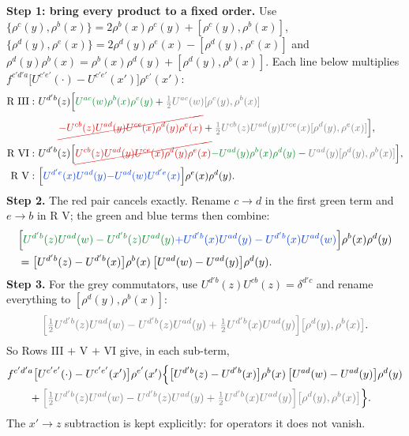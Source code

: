 \documentclass[9pt]{article}
\newcommand{\R}[1]{{\color{cR}#1}}
\newcommand{\B}[1]{{\color{cB}#1}}
\newcommand{\G}[1]{{\color{cG}#1}}
\newcommand{\Gr}[1]{{\color{cX}#1}}
\numberwithin{equation}{section}
\begin{document}
\noindent\textbf{Step 1: bring every product to a fixed order.} Use $\{\rho^{c}(y),\rho^{b}(x)\}=2\rho^{b}(x)\rho^{c}(y)+[\rho^{c}(y),\rho^{b}(x)]$, $\{\rho^{d}(y),\rho^{e}(x)\}=2\rho^{d}(y)\rho^{e}(x)-[\rho^{d}(y),\rho^{e}(x)]$ and $\rho^{d}(y)\rho^{b}(x)=\rho^{b}(x)\rho^{d}(y)+[\rho^{d}(y),\rho^{b}(x)]$. Each line below multiplies $f^{c'd'a}\big[U^{c'e'}(\cdot)-U^{c'e'}(x')\big]\rho^{e'}(x')$:
\begin{align}
\text{R III}:\ &U^{d'b}(z)\Big[\G{U^{ac}(w)\rho^{b}(x)\rho^{c}(y)}+\Gr{\tfrac12U^{ac}(w)[\rho^{c}(y),\rho^{b}(x)]}\notag\\
&\qquad\R{\cancel{-U^{cb}(z)U^{ad}(y)U^{ce}(x)\rho^{d}(y)\rho^{e}(x)}}+\Gr{\tfrac12U^{cb}(z)U^{ad}(y)U^{ce}(x)[\rho^{d}(y),\rho^{e}(x)]}\Big],\notag\\
\text{R VI}:\ &U^{d'b}(z)\Big[\R{\cancel{U^{cb}(z)U^{ad}(y)U^{ce}(x)\rho^{d}(y)\rho^{e}(x)}}\G{-U^{ad}(y)\rho^{b}(x)\rho^{d}(y)}-\Gr{U^{ad}(y)[\rho^{d}(y),\rho^{b}(x)]}\Big],\notag\\
\text{R V}:\ &\Big[\B{U^{d'e}(x)U^{ad}(y)}\B{-U^{ad}(w)U^{d'e}(x)}\Big]\rho^{e}(x)\rho^{d}(y).
\end{align}
\textbf{Step 2.} The \R{red} pair cancels exactly. Rename $c\to d$ in the first green term and $e\to b$ in R V; the \G{green} and \B{blue} terms then combine:
\begin{align}
&\Big[\G{U^{d'b}(z)U^{ad}(w)-U^{d'b}(z)U^{ad}(y)}\B{+U^{d'b}(x)U^{ad}(y)-U^{d'b}(x)U^{ad}(w)}\Big]\rho^{b}(x)\rho^{d}(y)\notag\\
&=\big[U^{d'b}(z)-U^{d'b}(x)\big]\rho^{b}(x)\,\big[U^{ad}(w)-U^{ad}(y)\big]\rho^{d}(y).
\end{align}
\textbf{Step 3.} For the \Gr{grey} commutators, use $U^{d'b}(z)U^{cb}(z)=\delta^{d'c}$ and rename everything to $[\rho^{d}(y),\rho^{b}(x)]$:
\begin{equation}
\Gr{\Big[\tfrac12U^{d'b}(z)U^{ad}(w)-U^{d'b}(z)U^{ad}(y)+\tfrac12U^{d'b}(x)U^{ad}(y)\Big]\big[\rho^{d}(y),\rho^{b}(x)\big]}.
\end{equation}
So Rows III $+$ V $+$ VI give, in each sub-term,
\begin{align}
&f^{c'd'a}\big[U^{c'e'}(\cdot)-U^{c'e'}(x')\big]\rho^{e'}(x')\Big\{\big[U^{d'b}(z)-U^{d'b}(x)\big]\rho^{b}(x)\,\big[U^{ad}(w)-U^{ad}(y)\big]\rho^{d}(y)\notag\\
&\qquad+\Gr{\Big[\tfrac12U^{d'b}(z)U^{ad}(w)-U^{d'b}(z)U^{ad}(y)+\tfrac12U^{d'b}(x)U^{ad}(y)\Big]\big[\rho^{d}(y),\rho^{b}(x)\big]}\Big\}.
\end{align}
The $x'\to z$ subtraction is kept explicitly: for operators it does not vanish.
\end{document}
